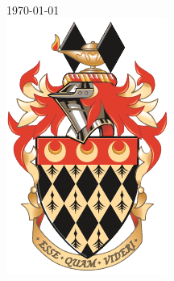 \begin{titlepage}


{\large \today}\\[2cm] %


\includegraphics[width=0.25\linewidth]{Royal_Holloway_coat_of_arms.png}\\[1cm] %
 

\vfill %

\end{titlepage}

